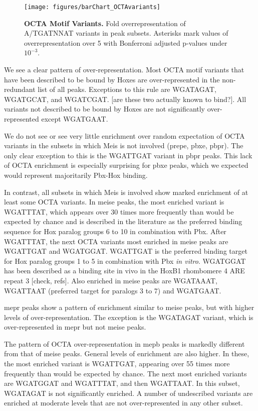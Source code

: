 \begin{figure}[]
  
  \centering
  \texttt{[image: figures/barChart\_OCTAvariants]}
  \caption[OCTA Motif Variants]{\textbf{OCTA Motif Variants.} Fold overrepresentation of A/TGATNNAT variants in peak subsets. Asterisks mark values of overrepresentation over 5 with Bonferroni adjusted p-values under $10^{-3}$.}
  \label{fig:OCTAvariants}
\end{figure}

We see a clear pattern of over-representation. Most \ac{OCTA} motif variants that have been described to be bound by Hoxes are over-represented in the non-redundant list of all peaks. Exceptions to this rule are WGATAGAT, WGATGCAT, and WGATCGAT. [are these two actually known to bind?]. All variants not described to be bound by Hoxes are not significantly over-represented except WGATGAAT.

We do not see or see very little enrichment over random expectation of \ac{OCTA} variants in the subsets in which Meis is not involved (\ac{prepe}, \ac{pbxe}, \ac{pbpr}). The only clear exception to this is the WGATTGAT variant in \ac{pbpr} peaks. This lack of \ac{OCTA} enrichment is especially surprising for \ac{pbxe} peaks, which we expected would represent majoritarily Pbx-Hox binding.

In contrast, all subsets in which Meis is involved show marked enrichment of at least some \ac{OCTA} variants. In \ac{meise} peaks, the most enriched variant is WGATTTAT, which appears over 30 times more frequently than would be expected by chance and is described in the literature as the preferred binding sequence for Hox paralog groups 6 to 10 in combination with Pbx. After WGATTTAT, the next \ac{OCTA} variants most enriched in \ac{meise} peaks are WGATTGAT and WGATGGAT. WGATTGAT is the preferred binding target for Hox paralog groups 1 to 5 in combination with Pbx \textit{in vitro}. WGATGGAT has been described as a binding site in vivo in the HoxB1 rhombomere 4 \ac{ARE} repeat 3 [check, refs]. Also enriched in \ac{meise} peaks are WGATAAAT, WGATTAAT (preferred target for paralogs 3 to 7) and WGATGAAT. 

\ac{mepr} peaks show a pattern of enrichment similar to \ac{meise} peaks, but with higher levels of over-representation. The exception is the WGATAGAT variant, which is over-represented in \ac{mepr} but not \ac{meise} peaks. 

The pattern of \ac{OCTA} over-representation in \ac{mepb} peaks is markedly different from that of \ac{meise} peaks. General levels of enrichment are also higher. In these, the most enriched variant is WGATTGAT, appearing over 55 times more frequently than would be expected by chance. The next most enriched variants are WGATGGAT and WGATTTAT, and then WGATTAAT. In this subset, WGATAGAT is not significantly enriched. A number of undescribed variants are enriched at moderate levels that are not over-represented in any other subset. 


